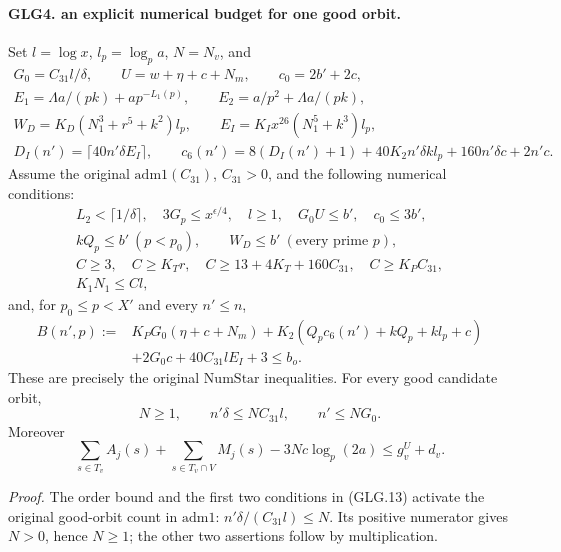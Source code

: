 \documentclass[11pt,a4paper]{article}
\numberwithin{equation}{section}
\theoremstyle{remark}\newtheorem{remark}[theorem]{Remark}
\begin{document}
\paragraph{GLG4. an explicit numerical budget for one good orbit.}
\label{claim:GLG4}
Set \(l=\log x\), \(l_p=\log_p a\), \(N=N_v\), and
\[
 \begin{gathered}
 G_0=C_{31}l/\delta,\qquad U=w+\eta+c+N_m,\qquad c_0=2b'+2c,\\
 E_1=\Lambda a/(pk)+ap^{-L_1(p)},\qquad
 E_2=a/p^2+\Lambda a/(pk),\\
 W_D=K_D(N_1^3+r^5+k^2)l_p,\qquad
 E_I=K_Ix^{26}(N_1^5+k^3)l_p,\\
 D_I(n')=\lceil40n'\delta E_I\rceil,\qquad
 c_6(n')=8(D_I(n')+1)+40K_2n'\delta k l_p
                       +160n'\delta c+2n'c .
 \end{gathered}                                                     \tag{GLG.12}
\]
Assume the original \(\mathrm{adm1}(C_{31})\), \(C_{31}>0\), and
the following numerical conditions:
\[
 \begin{gathered}
 L_2<\lceil1/\delta\rceil,\quad 3G_p\le x^{\epsilon/4},
 \quad l\ge1,\quad G_0U\le b',\quad c_0\le3b',\\
 kQ_p\le b'\ (p<p_0),\qquad W_D\le b'\ (\text{every prime }p),\\
 C\ge3,\quad C\ge K_Tr,\quad
 C\ge13+4K_T+160C_{31},\quad C\ge K_PC_{31},\\
 K_1N_1\le Cl ,
 \end{gathered}                                                     \tag{GLG.13}
\]
and, for \(p_0\le p<X'\) and every \(n'\le n\),
\[
 \begin{split}
 B(n',p):={}&K_PG_0(\eta+c+N_m)
       +K_2(Q_pc_6(n')+kQ_p+kl_p+c)\\
       &+2G_0c+40C_{31}lE_I+3\le b_o .
 \end{split}                                                       \tag{GLG.14}
\]
These are precisely the original \(\mathrm{NumStar}\) inequalities.
For every good candidate orbit,
\[
              N\ge1,\qquad n'\delta\le NC_{31}l,\qquad n'\le NG_0 .
                                                                    \tag{GLG.15}
\]
Moreover
\[
 \sum_{s\in T_v}A_j(s)+\sum_{s\in T_v\cap V}M_j(s)
                  -3Nc\log_p(2a)\le g_v^U+d_v .                   \tag{GLG.16}
\]

\emph{Proof.}
The order bound and the first two conditions in (GLG.13) activate
the original good-orbit count in \(\mathrm{adm1}\):
\(n'\delta/(C_{31}l)\le N\).
Its positive numerator gives \(N>0\), hence \(N\ge1\);
the other two assertions follow by multiplication.
\end{document}
